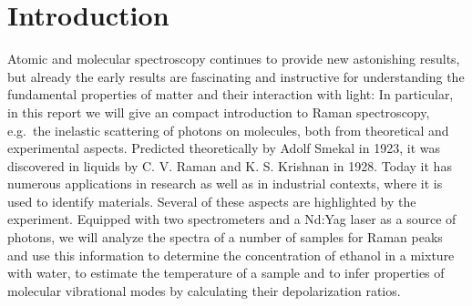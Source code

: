 \section{Introduction}
Atomic and molecular spectroscopy continues to provide new astonishing results, but already the early results are fascinating
and instructive for understanding the fundamental properties of matter and their interaction with light: In particular, in this
report we will give an compact introduction to Raman spectroscopy,
e.g.\ the inelastic scattering of photons on molecules, both from theoretical and experimental aspects. Predicted theoretically 
by Adolf Smekal in 1923, it was discovered in liquids by C. V. Raman and K. S. Krishnan in 1928\cite{venkataraman}. 
Today it has numerous applications in research as well as in industrial contexts, where it is used to identify materials. 
Several of these aspects are highlighted by the experiment. Equipped with two spectrometers and a Nd:Yag laser as a source
of photons, we will analyze the spectra of a number of samples for Raman peaks and use this information to determine the 
concentration of ethanol in a mixture with water, to estimate the temperature of a sample and to infer properties of 
molecular vibrational modes by calculating their depolarization ratios. 

